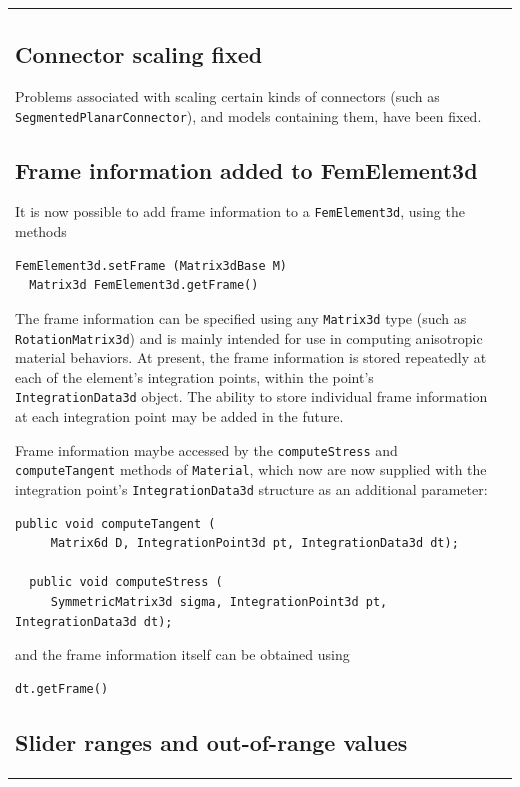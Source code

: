 \documentclass{article}
\begin{document}
\begin{tabular}{ll}
\subsection*{Connector scaling fixed}

Problems associated with scaling certain kinds of connectors (such as
{\tt SegmentedPlanarConnector}), and models containing them, have been fixed.

\subsection*{Frame information added to FemElement3d}

It is now possible to add frame information to a {\tt FemElement3d},
using the methods

\begin{lstlisting}[]
  FemElement3d.setFrame (Matrix3dBase M)
  Matrix3d FemElement3d.getFrame()
\end{lstlisting}

The frame information can be specified using any {\tt Matrix3d} type (such
as {\tt RotationMatrix3d}) and is mainly intended for use in computing
anisotropic material behaviors. At present, the frame information is
stored repeatedly at each of the element's integration points, within
the point's {\tt IntegrationData3d} object. The ability to store individual frame
information at each integration point may be added in the
future.

Frame information maybe accessed by the {\tt computeStress} and
{\tt computeTangent} methods of {\tt Material}, which now are now supplied
with the integration point's {\tt IntegrationData3d} structure as an
additional parameter:

\begin{lstlisting}[]
  public void computeTangent (
     Matrix6d D, IntegrationPoint3d pt, IntegrationData3d dt);
  
  public void computeStress (
     SymmetricMatrix3d sigma, IntegrationPoint3d pt, IntegrationData3d dt);  
\end{lstlisting}

and the frame information itself can be obtained using

\begin{lstlisting}[]
  dt.getFrame()
\end{lstlisting}
 
\subsection*{Slider ranges and out-of-range values}


\end{tabular}
\end{document}
